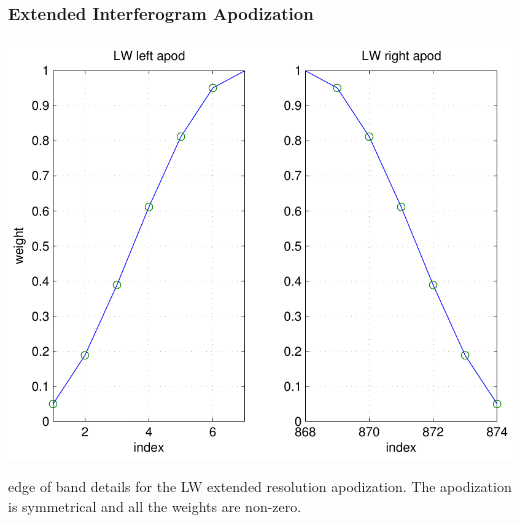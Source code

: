 \documentclass[10pt]{beamer}
\begin{document}
\begin{frame}
\frametitle{Extended Interferogram Apodization}
\begin{center}
  \includegraphics[scale=0.5]{figures/apod_LW.pdf}
\end{center}
edge of band details for the LW extended resolution apodization.
The apodization is symmetrical and all the weights are non-zero.
\end{frame}
\end{document}
